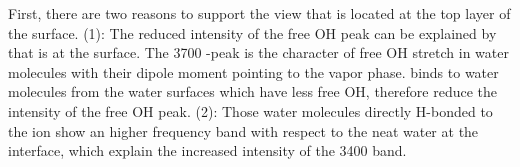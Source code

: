 %
%
%
%

First, there are two reasons to support the view that \nitrate is located at the top layer of the surface.
(1): The reduced intensity of the free OH peak can be explained by that \nitrate is at the surface.
The 3700 \centimeter-peak is the character of free OH stretch in water molecules with 
their dipole moment pointing to the vapor phase. \cite{Du93,Baldelli1997} 
\nitrate binds to water molecules from the water surfaces which have less free OH, therefore reduce the intensity of the free OH peak.
(2): Those water molecules directly H-bonded to the \nitrate ion show an higher frequency band with respect to the neat 
water at the interface, which explain the increased intensity of the 3400 \cm band.

